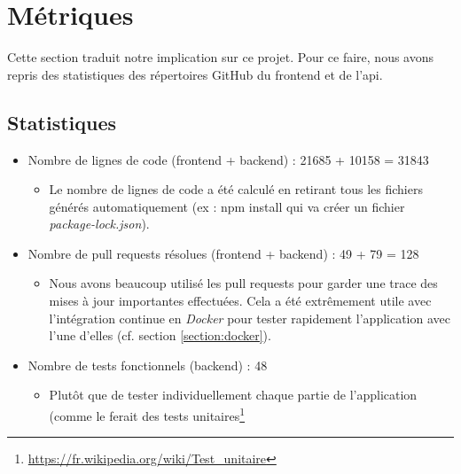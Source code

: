 \section{Métriques}
\label{section:codeMetrics}

Cette section traduit notre implication sur ce projet. 
Pour ce faire, nous avons repris des statistiques des répertoires GitHub du \gls{frontend} et de l'\gls{api}. 

\subsection{Statistiques}

\begin{itemize}[nosep,noitemsep,topsep=0pt,partopsep=0pt,after=\vspace*{2pt}]
    \item Nombre de lignes de code (\gls{frontend} + \gls{backend}) : 21685 + 10158 = 31843
    \begin{itemize}[nosep,noitemsep,topsep=0pt,partopsep=0pt,after=\vspace*{2pt}]
        \item Le nombre de lignes de code a été calculé en retirant tous les fichiers générés automatiquement (ex : npm install qui va créer un fichier \textit{package-lock.json}).
    \end{itemize}
    \item Nombre de pull requests résolues (\gls{frontend} + \gls{backend}) : 49 + 79 = 128
    \begin{itemize}[nosep,noitemsep,topsep=0pt,partopsep=0pt,after=\vspace*{2pt}]
        \item Nous avons beaucoup utilisé les pull requests pour garder une trace des mises à jour importantes effectuées. Cela a été extrêmement utile avec l'intégration continue en \textit{Docker} pour tester rapidement l'application avec l'une d'elles (cf. section \ref{section:docker}).
    \end{itemize}
    \item Nombre de tests fonctionnels (\gls{backend}) : 48
    \begin{itemize}[nosep,noitemsep,topsep=0pt,partopsep=0pt,after=\vspace*{2pt}]
        \item Plutôt que de tester individuellement chaque partie de l'application (comme le ferait des tests 
        unitaires\footnote{
            \href{https://fr.wikipedia.org/wiki/Test\_unitaire}{https://fr.wikipedia.org/wiki/Test\_unitaire}
}
\end{itemize}
\end{itemize}
